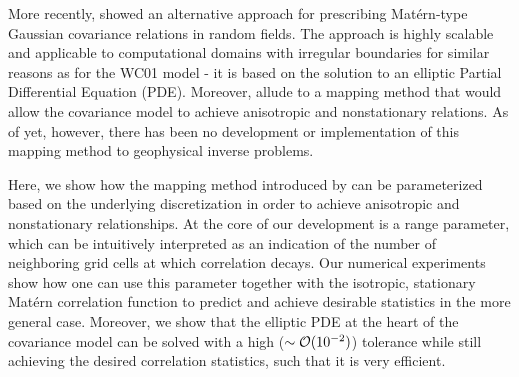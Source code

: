 %

More recently, \citet{RSSB:RSSB777} showed an alternative approach for
prescribing Mat\'ern-type Gaussian covariance relations in random fields.
The approach is highly scalable and applicable to computational domains with
irregular boundaries for similar reasons as for the WC01 model -
it is based on the solution to an elliptic Partial
Differential Equation (PDE).
Moreover, \citet{RSSB:RSSB777} allude to a mapping method that would allow the
covariance model to achieve anisotropic and nonstationary relations.
As of yet, however, there has been no development or implementation of this
mapping method to geophysical inverse problems.

Here, we show how the mapping method introduced by \citet{RSSB:RSSB777}
can be parameterized based on the underlying discretization
in order to achieve anisotropic and nonstationary relationships.
At the core of our development is a range parameter, which can be intuitively
interpreted as an indication of the number of neighboring grid cells at which
correlation decays.
Our numerical experiments show how one can use this parameter together with the
isotropic, stationary Mat\'ern correlation function to predict and achieve desirable
statistics in the more general case.
Moreover, we show that the elliptic PDE at the heart of the covariance model can
be solved with a high ($\sim\mathcal{O}(10^{-2})$) tolerance while still achieving the
desired correlation statistics, such that it is very efficient.

